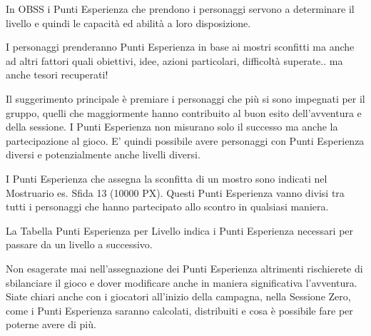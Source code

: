 \begin{multicols}{2}
\label{punti-esperienza}

In OBSS i Punti Esperienza che prendono i personaggi servono a determinare il livello e quindi le capacità ed abilità a loro disposizione.

I personaggi prenderanno Punti Esperienza in base ai mostri sconfitti ma anche ad altri fattori quali obiettivi, idee, azioni particolari, difficoltà superate.. ma anche tesori recuperati!

Il suggerimento principale è premiare i personaggi che più si sono impegnati per il gruppo, quelli che maggiormente hanno contribuito al buon esito dell'avventura e della sessione. I Punti Esperienza non misurano solo il successo ma anche la partecipazione al gioco.
E' quindi possibile avere personaggi con Punti Esperienza diversi e potenzialmente anche livelli diversi.

I Punti Esperienza che assegna la sconfitta di un mostro sono indicati nel Mostruario es. Sfida 13 (10000 PX). Questi Punti Esperienza vanno divisi tra tutti i personaggi che hanno partecipato allo scontro in qualsiasi maniera.

La Tabella Punti Esperienza per Livello indica i Punti Esperienza necessari per passare da un livello a successivo.

Non esagerate mai nell'assegnazione dei Punti Esperienza altrimenti rischierete di sbilanciare il gioco e dover modificare anche in maniera significativa l'avventura. Siate chiari anche con i giocatori all'inizio della campagna, nella Sessione Zero, come i Punti Esperienza saranno calcolati, distribuiti e cosa è possibile fare per poterne avere di più.



\end{multicols}
